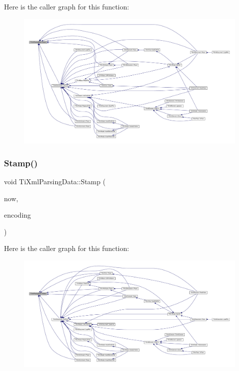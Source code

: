 Here is the caller graph for this function\+:
\nopagebreak
\begin{figure}[H]
\begin{center}
\leavevmode
\includegraphics[width=350pt]{class_ti_xml_parsing_data_a02ba4903fd3b70b43524ad60a4eece7c_icgraph}
\end{center}
\end{figure}
\mbox{\label{class_ti_xml_parsing_data_a65cee8ab77a36c605db08c84b4c30a7d}} 
\subsubsection{\texorpdfstring{Stamp()}{Stamp()}}
{\footnotesize\ttfamily void Ti\+Xml\+Parsing\+Data\+::\+Stamp (\begin{DoxyParamCaption}\item[{const char $\ast$}]{now,  }\item[{\hyperlink{tinyxml_8h_a88d51847a13ee0f4b4d320d03d2c4d96}{Ti\+Xml\+Encoding}}]{encoding }\end{DoxyParamCaption})}

Here is the caller graph for this function\+:
\nopagebreak
\begin{figure}[H]
\begin{center}
\leavevmode
\includegraphics[width=350pt]{class_ti_xml_parsing_data_a65cee8ab77a36c605db08c84b4c30a7d_icgraph}
\end{center}
\end{figure}



